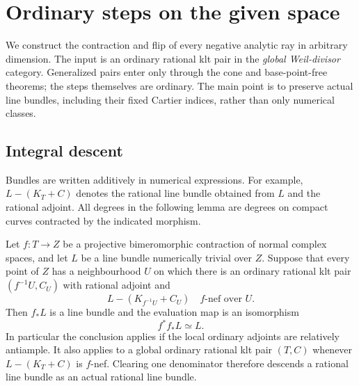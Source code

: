 \section{Ordinary steps on the given space}\label{sec:absolute}

We construct the contraction and flip of every negative analytic ray in
arbitrary dimension.  The input is an ordinary rational klt pair in the
\emph{global Weil-divisor} category.  Generalized pairs enter only through
the cone and base-point-free theorems; the steps themselves are ordinary.
The main point is to preserve actual line bundles, including their fixed
Cartier indices, rather than only numerical classes.

\subsection{Integral descent}

Bundles are written additively in numerical expressions.  For example,
$L-(K_T+C)$ denotes the rational line bundle obtained from $L$ and the
rational adjoint.  All degrees in the following lemma are degrees on
compact curves contracted by the indicated morphism.

\begin{lemma}\label{lem:descent}
Let $f:T\to Z$ be a projective bimeromorphic contraction of normal complex
spaces, and let $L$ be a line bundle numerically trivial over $Z$.
Suppose that every point of $Z$ has a neighbourhood $U$ on which there is
an ordinary rational klt pair $(f^{-1}U,C_U)$ with rational adjoint and
\[
 L-(K_{f^{-1}U}+C_U)\quad\text{$f$-nef over $U$}.
\]
Then $f_*L$ is a line bundle and the evaluation map is an isomorphism
\begin{equation}\label{eq:integral-descent}
 f^*f_*L\simeq L.
\end{equation}
In particular the conclusion applies if the local ordinary adjoints are
relatively antiample.  It also applies to a global ordinary rational klt
pair $(T,C)$ whenever $L-(K_T+C)$ is $f$-nef.  Clearing one denominator
therefore descends a rational line bundle as an actual rational line
bundle.
\end{lemma}

